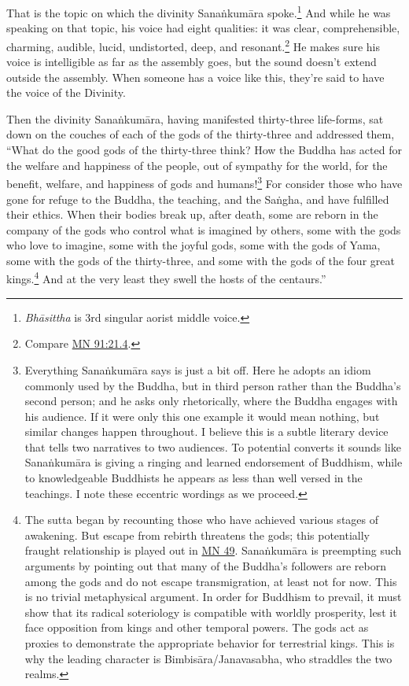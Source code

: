 \documentclass[12pt,openany]{book}%
\begin{document}
That is the topic on which the divinity \textsanskrit{Sanaṅkumāra} spoke.\footnote{\textit{\textsanskrit{Bhāsittha}} is 3rd singular aorist middle voice. } And while he was speaking on that topic, his voice had eight qualities: it was clear, comprehensible, charming, audible, lucid, undistorted, deep, and resonant.\footnote{Compare \href{https://suttacentral.net/mn91/en/sujato\#21.4}{MN 91:21.4}. } He makes sure his voice is intelligible as far as the assembly goes, but the sound doesn’t extend outside the assembly. When someone has a voice like this, they’re said to have the voice of the Divinity. 

Then the divinity \textsanskrit{Sanaṅkumāra}, having manifested thirty-three life-forms, sat down on the couches of each of the gods of the thirty-three and addressed them, “What do the good gods of the thirty-three think? How the Buddha has acted for the welfare and happiness of the people, out of sympathy for the world, for the benefit, welfare, and happiness of gods and humans!\footnote{Everything \textsanskrit{Sanaṅkumāra} says is just a bit off. Here he adopts an idiom commonly used by the Buddha, but in third person rather than the Buddha’s second person; and he asks only rhetorically, where the Buddha engages with his audience. If it were only this one example it would mean nothing, but similar changes happen throughout. I believe this is a subtle literary device that tells two narratives to two audiences. To potential converts it sounds like \textsanskrit{Sanaṅkumāra} is giving a ringing and learned endorsement of Buddhism, while to knowledgeable Buddhists he appears as less than well versed in the teachings. I note these eccentric wordings as we proceed. } For consider those who have gone for refuge to the Buddha, the teaching, and the \textsanskrit{Saṅgha}, and have fulfilled their ethics. When their bodies break up, after death, some are reborn in the company of the gods who control what is imagined by others, some with the gods who love to imagine, some with the joyful gods, some with the gods of Yama, some with the gods of the thirty-three, and some with the gods of the four great kings.\footnote{The sutta began by recounting those who have achieved various stages of awakening. But escape from rebirth threatens the gods; this potentially fraught relationship is played out in \href{https://suttacentral.net/mn49/en/sujato}{MN 49}. \textsanskrit{Sanaṅkumāra} is preempting such arguments by pointing out that many of the Buddha’s followers are reborn among the gods and do not escape transmigration, at least not for now. This is no trivial metaphysical argument. In order for Buddhism to prevail, it must show that its radical soteriology is compatible with worldly prosperity, lest it face opposition from kings and other temporal powers. The gods act as proxies to demonstrate the appropriate behavior for terrestrial kings. This is why the leading character is \textsanskrit{Bimbisāra}/Janavasabha, who straddles the two realms. } And at the very least they swell the hosts of the centaurs.” 
\end{document}
